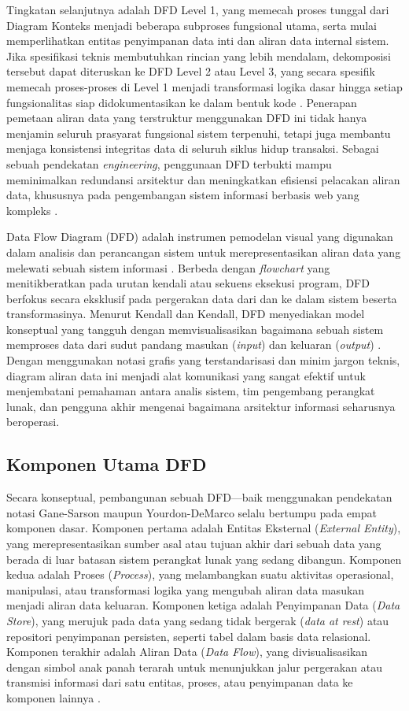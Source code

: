 \documentclass[12pt,a4paper,twoside]{report}
\begin{document}
Tingkatan selanjutnya adalah DFD Level 1, yang memecah proses tunggal dari Diagram Konteks menjadi beberapa subproses fungsional utama, serta mulai memperlihatkan entitas penyimpanan data inti dan aliran data internal sistem. Jika spesifikasi teknis membutuhkan rincian yang lebih mendalam, dekomposisi tersebut dapat diteruskan ke DFD Level 2 atau Level 3, yang secara spesifik memecah proses-proses di Level 1 menjadi transformasi logika dasar hingga setiap fungsionalitas siap didokumentasikan ke dalam bentuk kode \cite{kendall2014}. Penerapan pemetaan aliran data yang terstruktur menggunakan DFD ini tidak hanya menjamin seluruh prasyarat fungsional sistem terpenuhi, tetapi juga membantu menjaga konsistensi integritas data di seluruh siklus hidup transaksi. Sebagai sebuah pendekatan \textit{engineering}, penggunaan DFD terbukti mampu meminimalkan redundansi arsitektur dan meningkatkan efisiensi pelacakan aliran data, khususnya pada pengembangan sistem informasi berbasis web yang kompleks \cite{adekunle2024}.

Data Flow Diagram (DFD) adalah instrumen pemodelan visual yang digunakan dalam analisis dan perancangan sistem untuk merepresentasikan aliran data yang melewati sebuah sistem informasi \cite{kendall2014}. Berbeda dengan \textit{flowchart} yang menitikberatkan pada urutan kendali atau sekuens eksekusi program, DFD berfokus secara eksklusif pada pergerakan data dari dan ke dalam sistem beserta transformasinya. Menurut Kendall dan Kendall, DFD menyediakan model konseptual yang tangguh dengan memvisualisasikan bagaimana sebuah sistem memproses data dari sudut pandang masukan (\textit{input}) dan keluaran (\textit{output}) \cite{kendall2014}. Dengan menggunakan notasi grafis yang terstandarisasi dan minim jargon teknis, diagram aliran data ini menjadi alat komunikasi yang sangat efektif untuk menjembatani pemahaman antara analis sistem, tim pengembang perangkat lunak, dan pengguna akhir mengenai bagaimana arsitektur informasi seharusnya beroperasi.

\subsection{Komponen Utama DFD}

Secara konseptual, pembangunan sebuah DFD—baik menggunakan pendekatan notasi Gane-Sarson maupun Yourdon-DeMarco selalu bertumpu pada empat komponen dasar. Komponen pertama adalah Entitas Eksternal (\textit{External Entity}), yang merepresentasikan sumber asal atau tujuan akhir dari sebuah data yang berada di luar batasan sistem perangkat lunak yang sedang dibangun. Komponen kedua adalah Proses (\textit{Process}), yang melambangkan suatu aktivitas operasional, manipulasi, atau transformasi logika yang mengubah aliran data masukan menjadi aliran data keluaran. Komponen ketiga adalah Penyimpanan Data (\textit{Data Store}), yang merujuk pada data yang sedang tidak bergerak (\textit{data at rest}) atau repositori penyimpanan persisten, seperti tabel dalam basis data relasional. Komponen terakhir adalah Aliran Data (\textit{Data Flow}), yang divisualisasikan dengan simbol anak panah terarah untuk menunjukkan jalur pergerakan atau transmisi informasi dari satu entitas, proses, atau penyimpanan data ke komponen lainnya \cite{kendall2014}.
\end{document}
